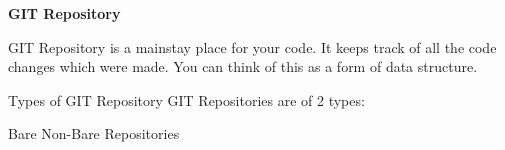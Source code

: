 {\bf GIT Repository}

GIT Repository is a mainstay place for your code. It keeps track of all the code changes which were made. You can think of this as a form of data structure.

Types of GIT Repository
GIT Repositories are of 2 types:

Bare
Non-Bare Repositories
